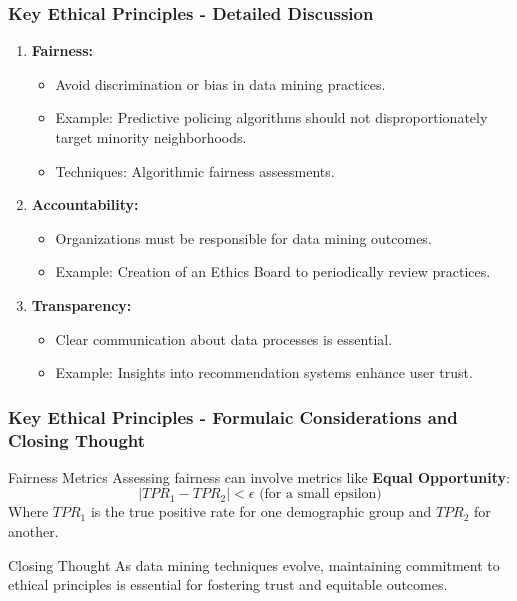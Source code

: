 \documentclass[aspectratio=169]{beamer}
\begin{document}
\begin{frame}[fragile]
    \frametitle{Key Ethical Principles - Detailed Discussion}
    \begin{enumerate}
        \item \textbf{Fairness:}
        \begin{itemize}
            \item Avoid discrimination or bias in data mining practices.
            \item Example: Predictive policing algorithms should not disproportionately target minority neighborhoods.
            \item Techniques: Algorithmic fairness assessments.
        \end{itemize}
        
        \item \textbf{Accountability:}
        \begin{itemize}
            \item Organizations must be responsible for data mining outcomes.
            \item Example: Creation of an Ethics Board to periodically review practices.
        \end{itemize}
        
        \item \textbf{Transparency:}
        \begin{itemize}
            \item Clear communication about data processes is essential.
            \item Example: Insights into recommendation systems enhance user trust.
        \end{itemize}
    \end{enumerate}
\end{frame}

\begin{frame}[fragile]
    \frametitle{Key Ethical Principles - Formulaic Considerations and Closing Thought}
    \begin{block}{Fairness Metrics}
        Assessing fairness can involve metrics like \textbf{Equal Opportunity}:
        \begin{equation}
            |TPR_1 - TPR_2| < \epsilon \text{ (for a small epsilon)}
        \end{equation}
        Where \(TPR_1\) is the true positive rate for one demographic group and \(TPR_2\) for another.
    \end{block}
    
    \begin{block}{Closing Thought}
        As data mining techniques evolve, maintaining commitment to ethical principles is essential for fostering trust and equitable outcomes.
    \end{block}
\end{frame}
\end{document}
